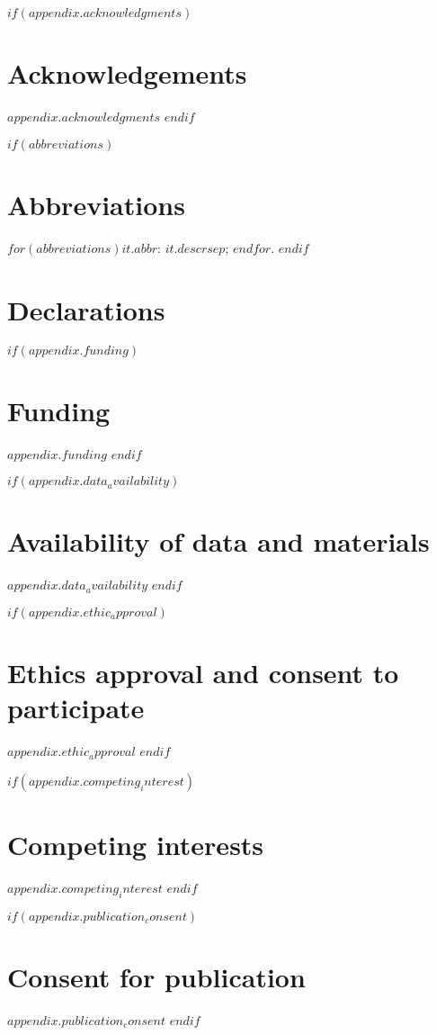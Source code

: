 \documentclass[$if(line_numbers)$
linenumbers,
$endif$
$if(double_spacing)$
doublespacing,
$endif$
$if(two_columns)$
twocolumn,
$endif$]{bmcart}
\begin{document}
\begin{backmatter}

$if(appendix.acknowledgments)$
\section*{Acknowledgements}%
$appendix.acknowledgments$
$endif$

$if(abbreviations)$
\section*{Abbreviations}%
$for(abbreviations)$$it.abbr$: $it.descr$$sep$; $endfor$.
$endif$

\vspace{2em}
\section*{Declarations}
\vspace{1em}

$if(appendix.funding)$
\section*{Funding}%
$appendix.funding$
$endif$

$if(appendix.data_availability)$
\section*{Availability of data and materials}%
$appendix.data_availability$
$endif$

$if(appendix.ethic_approval)$
\section*{Ethics approval and consent to participate}%
$appendix.ethic_approval$
$endif$

$if(appendix.competing_interest)$
\section*{Competing interests}
$appendix.competing_interest$
$endif$

$if(appendix.publication_consent)$
\section*{Consent for publication}%
$appendix.publication_consent$
$endif$


\end{backmatter}
\end{document}
